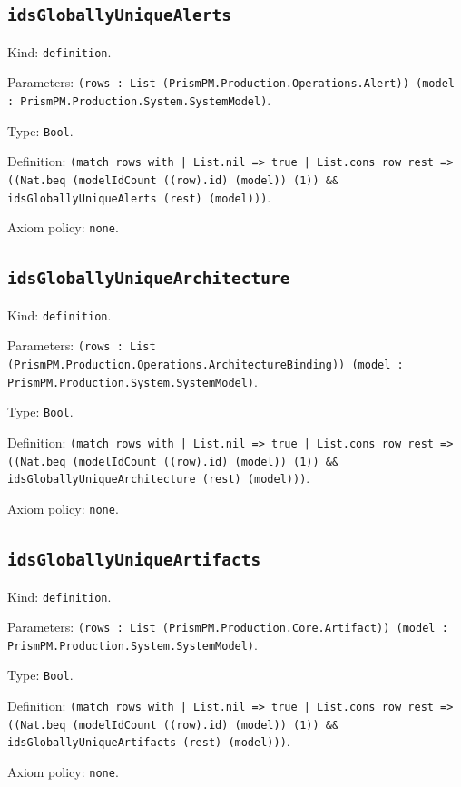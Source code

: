\documentclass[11pt]{article}
\begin{document}
\subsection*{\texttt{idsGloballyUniqueAlerts}}
\noindent Kind: \texttt{definition}.\par
\noindent Parameters: \texttt{(rows : List (PrismPM.Production.Operations.Alert)) (model : PrismPM.Production.System.SystemModel)}.\par
\noindent Type: \texttt{Bool}.\par
\noindent Definition: \texttt{(match rows with | List.nil => true | List.cons row rest => ((Nat.beq (modelIdCount ((row).id) (model)) (1)) \&\& idsGloballyUniqueAlerts (rest) (model)))}.\par
\noindent Axiom policy: \texttt{none}.\par
\subsection*{\texttt{idsGloballyUniqueArchitecture}}
\noindent Kind: \texttt{definition}.\par
\noindent Parameters: \texttt{(rows : List (PrismPM.Production.Operations.ArchitectureBinding)) (model : PrismPM.Production.System.SystemModel)}.\par
\noindent Type: \texttt{Bool}.\par
\noindent Definition: \texttt{(match rows with | List.nil => true | List.cons row rest => ((Nat.beq (modelIdCount ((row).id) (model)) (1)) \&\& idsGloballyUniqueArchitecture (rest) (model)))}.\par
\noindent Axiom policy: \texttt{none}.\par
\subsection*{\texttt{idsGloballyUniqueArtifacts}}
\noindent Kind: \texttt{definition}.\par
\noindent Parameters: \texttt{(rows : List (PrismPM.Production.Core.Artifact)) (model : PrismPM.Production.System.SystemModel)}.\par
\noindent Type: \texttt{Bool}.\par
\noindent Definition: \texttt{(match rows with | List.nil => true | List.cons row rest => ((Nat.beq (modelIdCount ((row).id) (model)) (1)) \&\& idsGloballyUniqueArtifacts (rest) (model)))}.\par
\noindent Axiom policy: \texttt{none}.\par
\end{document}
